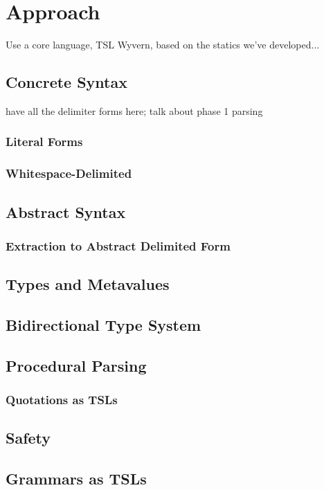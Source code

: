\section{Approach}
Use a core language, TSL Wyvern, based on the statics we've developed...

\subsection{Concrete Syntax}
have all the delimiter forms here; talk about phase 1 parsing
\label{s:approach}
\subsubsection{Literal Forms}
\subsubsection{Whitespace-Delimited}

\subsection{Abstract Syntax}
\subsubsection{Extraction to Abstract Delimited Form}

\subsection{Types and Metavalues}
\subsection{Bidirectional Type System}
\subsection{Procedural Parsing}
\subsubsection{Quotations as TSLs}
\subsection{Safety}
\subsection{Grammars as TSLs}
